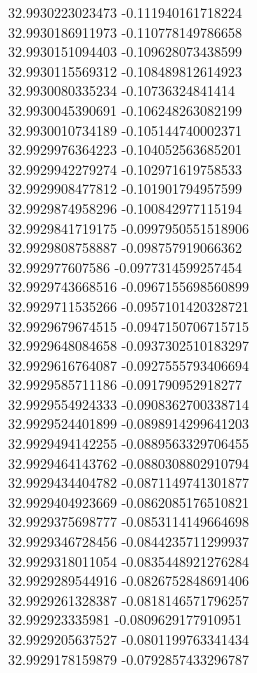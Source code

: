 {32.9930223023473	-0.111940161718224\\
32.9930186911973	-0.110778149786658\\
32.9930151094403	-0.109628073438599\\
32.9930115569312	-0.108489812614923\\
32.9930080335234	-0.10736324841414\\
32.9930045390691	-0.106248263082199\\
32.9930010734189	-0.105144740002371\\
32.9929976364223	-0.104052563685201\\
32.9929942279274	-0.102971619758533\\
32.9929908477812	-0.101901794957599\\
32.9929874958296	-0.100842977115194\\
32.9929841719175	-0.0997950551518906\\
32.9929808758887	-0.098757919066362\\
32.992977607586	-0.0977314599257454\\
32.9929743668516	-0.0967155698560899\\
32.9929711535266	-0.0957101420328721\\
32.9929679674515	-0.0947150706715715\\
32.9929648084658	-0.0937302510183297\\
32.9929616764087	-0.0927555793406694\\
32.9929585711186	-0.091790952918277\\
32.9929554924333	-0.0908362700338714\\
32.9929524401899	-0.0898914299641203\\
32.9929494142255	-0.0889563329706455\\
32.9929464143762	-0.0880308802910794\\
32.9929434404782	-0.0871149741301877\\
32.9929404923669	-0.0862085176510821\\
32.9929375698777	-0.0853114149664698\\
32.9929346728456	-0.0844235711299937\\
32.9929318011054	-0.0835448921276284\\
32.9929289544916	-0.0826752848691406\\
32.9929261328387	-0.0818146571796257\\
32.992923335981	-0.0809629177910951\\
32.9929205637527	-0.0801199763341434\\
32.9929178159879	-0.0792857433296787\\
}
